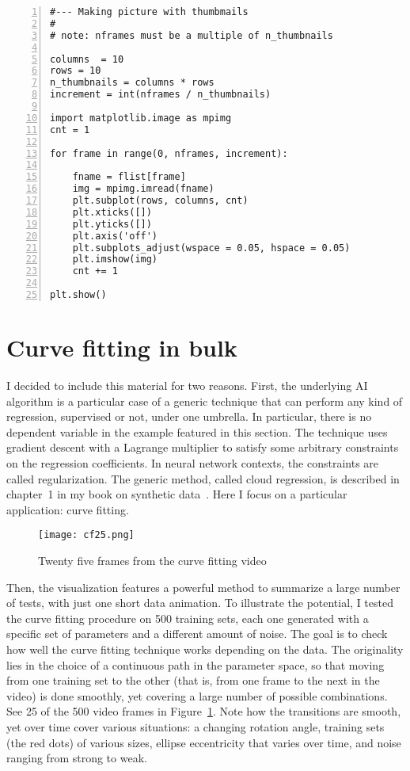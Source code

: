 \documentclass[oneside,10pt]{book}
\begin{document}
\begin{lstlisting}[numbers=left]
#--- Making picture with thumbmails
#
# note: nframes must be a multiple of n_thumbnails

columns  = 10
rows = 10
n_thumbnails = columns * rows
increment = int(nframes / n_thumbnails) 

import matplotlib.image as mpimg
cnt = 1

for frame in range(0, nframes, increment):

    fname = flist[frame]
    img = mpimg.imread(fname)
    plt.subplot(rows, columns, cnt)
    plt.xticks([])  
    plt.yticks([])
    plt.axis('off')
    plt.subplots_adjust(wspace = 0.05, hspace = 0.05)
    plt.imshow(img)
    cnt += 1

plt.show()
\end{lstlisting}

\section{Curve fitting in bulk}

I decided to include this material for two reasons. First, the underlying AI algorithm is a particular case of a generic technique that can perform any kind of regression, supervised or not, under one umbrella. In particular, there is no dependent variable in the example featured in this section.
 The technique uses \textcolor{index}{gradient descent} with a \textcolor{index}{Lagrange multiplier} to satisfy some arbitrary constraints on the regression coefficients. 
 In neural network contexts, the constraints are called \textcolor{index}{regularization}. 
The generic method, called \textcolor{index}{cloud regression}, 
is described in chapter~1 in my book on synthetic data~\cite{vgsynthetic}. Here I focus on a particular application:
 \textcolor{index}{curve fitting}.

\begin{figure}[H]
\centering
\texttt{[image: cf25.png]}   
\caption{Twenty five frames from the curve fitting video}
\label{ringersap25r}
\end{figure}

Then, the visualization features a powerful method to summarize a large number of tests, with just one short data animation.
 To illustrate the potential, I tested the curve fitting procedure on 500 training sets, each one generated with
 a specific set of parameters and a different amount of noise. The goal is to check how well the curve fitting technique works depending on the data.
The originality lies in the choice of a continuous path in the parameter space, so that moving from one training set to the other (that is, from one frame
 to the next in the video) is done smoothly, yet covering a large number of possible combinations.
See 25 of the 500 video frames in Figure~\ref{ringersap25r}. Note how the transitions are smooth, yet over time cover various situations:
 a changing rotation angle, training sets (the red dots) of various sizes, ellipse eccentricity that varies over time, and noise ranging from strong to weak. 
\end{document}
